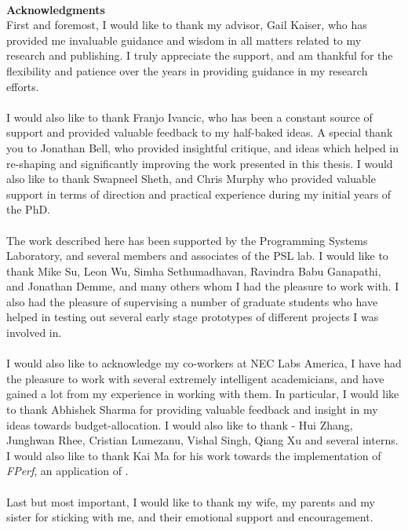 ~\\[1in] %
\textbf{\Huge Acknowledgments}\\

\noindent 
First and foremost, I would like to thank my advisor, Gail Kaiser, who has provided me invaluable guidance and wisdom in all matters related to my research and publishing. I truly appreciate the support, and am thankful for the flexibility and patience over the years in providing guidance in my research efforts.
\\ \\
I would also like to thank Franjo Ivancic, who has been a constant source of support and provided valuable feedback to my half-baked ideas.
A special thank you to Jonathan Bell, who provided insightful critique, and ideas which helped in re-shaping and significantly improving the work presented in this thesis. I would also like to thank Swapneel Sheth, and Chris Murphy who provided valuable support in terms of direction and practical experience during my initial years of the PhD.
\\ \\
The work described here has been supported by the Programming Systems Laboratory, and several members and associates of the PSL lab. 
I would like to thank Mike Su, Leon Wu, Simha Sethumadhavan, Ravindra Babu Ganapathi, and Jonathan Demme, and many others whom I had the pleasure to work with. I also had the pleasure of supervising a number of graduate students who have helped in testing out several early stage prototypes of different projects I was involved in.
\\ \\
I would also like to acknowledge my co-workers at NEC Labs America, I have had the pleasure to work with several extremely intelligent academicians, and have gained a lot from my experience in working with them. In particular, I would like to thank Abhishek Sharma for providing valuable feedback and insight in my ideas towards budget-allocation. I would also like to thank - Hui Zhang, Junghwan Rhee, Cristian Lumezanu, Vishal Singh, Qiang Xu and several interns. I would also like to thank Kai Ma for his work towards the implementation of \emph{FPerf}, an application of \iprobe. 
\\ \\
Last but most important, I would like to thank my wife, my parents and my sister for sticking with me, and their emotional support and encouragement.
